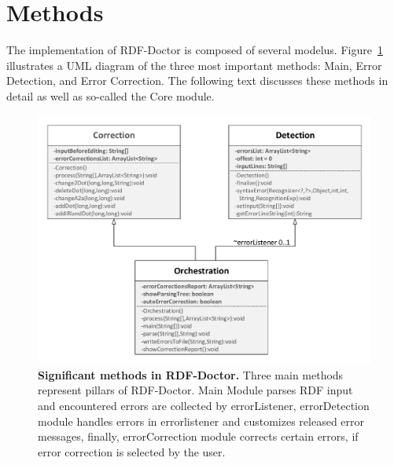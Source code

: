 
\section {Methods} 

The implementation of RDF-Doctor is composed of several modelus.
{Figure~\ref{Fig:UML}} illustrates a UML diagram of the three most important methods: Main, Error Detection, and Error Correction. 
The following text discusses these methods in detail as well as so-called the Core module.%

	\begin{figure}[ht]
	\begin{center}
		\includegraphics[scale=0.65,angle=0]{images/methods.pdf}
		\setlength{\abovecaptionskip}{0pt} 
				\setlength\belowcaptionskip{-5mm}
		\caption{\textbf{Significant methods in RDF-Doctor.} 
		Three main methods represent pillars of RDF-Doctor. Main Module parses RDF input and encountered errors are collected by errorListener, errorDetection module handles errors in errorlistener and customizes released error messages, finally, errorCorrection module corrects certain errors, if error correction is selected by the user.}
		\label{Fig:UML}
	\end{center}
\end{figure}
\vspace{-5mm}

